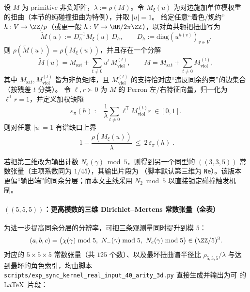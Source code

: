 \begin{remark}\label{prop:arity-defect-implies-gap}
设 \(M\) 为 primitive 非负矩阵，\(\lambda:=\rho(M)\)。令 \(M_\xi(u)\) 为对边施加单位模权重的扭曲（本节的纯碰撞扭曲为特例），并取 \(|u|=1\)。
给定任意“着色/规约” \(h:V\to \ZZ/p\)（或更一般 \(h:V\to \RR/2\pi\ZZ\)），以对角共轭把扭曲写为
\[
\widetilde M(u):=D_h^{-1}M_\xi(u)\,D_h,
\qquad D_h:=\mathrm{diag}(u^{h(v)})_{v\in V}.
\]
则 \(\rho(\widetilde M(u))=\rho(M_\xi(u))\)，并且存在一个分解
\[
\widetilde M(u)=M_{\mathrm{sat}}+\sum_{t\neq 0}u^{t}\,M_{\mathrm{viol}}^{(t)},
\qquad
M=M_{\mathrm{sat}}+\sum_{t\neq 0}M_{\mathrm{viol}}^{(t)},
\]
其中 \(M_{\mathrm{sat}},M_{\mathrm{viol}}^{(t)}\) 皆为非负矩阵，且 \(M_{\mathrm{viol}}^{(t)}\) 的支持恰对应“违反同余约束”的边集合（按残差 \(t\) 分类）。
令 \(\ell,r\succ 0\) 为 \(M\) 的 Perron 左/右特征向量，归一化为 \(\ell^{\mathsf T}r=1\)，并定义加权缺陷
\[
\varepsilon_\pi(h):=\frac{1}{\lambda}\sum_{t\neq 0}\ell^{\mathsf T}M_{\mathrm{viol}}^{(t)}r\ \in[0,1].
\]
则对任意 \(|u|=1\) 有谱缺口上界
\[
\boxed{\;
1-\frac{\rho(M_\xi(u))}{\lambda}\ \le\ 2\,\varepsilon_\pi(h)\; }.
\]
\end{remark}

\begin{remark}\label{rem:arity-335-ne-mod5}
若把第三维改为输出计数 $N_e(\gamma)\bmod 5$，则得到另一个同型的 $((3,3,5))$ 常数张量（主项系数同为 $1/45$），其输出片段为
\verb||
（脚本默认第三维为 \texttt{Ne}）。该版本更偏“输出端”的同余分层；而本文主线采用 $N_2\bmod 5$ 以直接锁定碰撞触发机制。
\end{remark}

\paragraph{\texorpdfstring{$((5,5,5))$}{(5,5,5)}：更高模数的三维 Dirichlet--Mertens 常数张量（全表）}
为进一步提高同余分层的分辨率，可把三条观测量同时提升到模 $5$：
$$
(a,b,c)=\bigl(\chi(\gamma)\bmod 5,\ N_-(\gamma)\bmod 5,\ N_e(\gamma)\bmod 5\bigr)\in(\ZZ/5)^3.
$$
对应的 $5\times 5\times 5$ 常数张量（共 $125$ 个数）、以及最坏扭曲谱半径比 $\rho_{5,5,5}/\lambda$ 与达到最坏的角色索引，均由脚本
\texttt{scripts/exp\_sync\_kernel\_real\_input\_40\_arity\_3d.py}
直接生成并输出为可 \verb|| 的 \LaTeX\ 片段：


